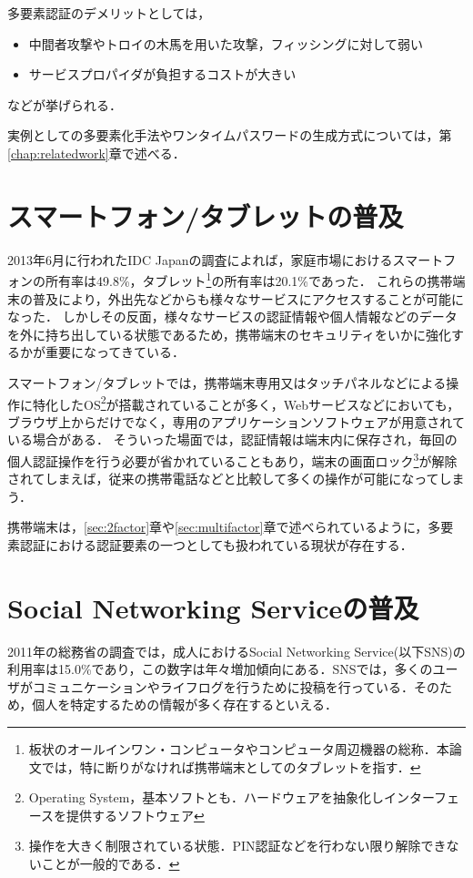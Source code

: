 多要素認証のデメリットとしては，
\begin{itemize}
\item 中間者攻撃やトロイの木馬を用いた攻撃，フィッシングに対して弱い
\item サービスプロパイダが負担するコストが大きい
\end{itemize}
などが挙げられる．

実例としての多要素化手法やワンタイムパスワードの生成方式については，第\ref{chap:relatedwork}章で述べる．

\section{スマートフォン/タブレットの普及}
2013年6月に行われたIDC Japanの調査\cite{idcsmartphone}によれば，家庭市場におけるスマートフォンの所有率は49.8\%，タブレット\footnote{板状のオールインワン・コンピュータやコンピュータ周辺機器の総称．本論文では，特に断りがなければ携帯端末としてのタブレットを指す．}の所有率は20.1\%であった．
これらの携帯端末の普及により，外出先などからも様々なサービスにアクセスすることが可能になった．
しかしその反面，様々なサービスの認証情報や個人情報などのデータを外に持ち出している状態であるため，携帯端末のセキュリティをいかに強化するかが重要になってきている．

スマートフォン/タブレットでは，携帯端末専用又はタッチパネルなどによる操作に特化したOS\footnote{Operating System，基本ソフトとも．ハードウェアを抽象化しインターフェースを提供するソフトウェア}が搭載されていることが多く，Webサービスなどにおいても，ブラウザ上からだけでなく，専用のアプリケーションソフトウェアが用意されている場合がある．
そういった場面では，認証情報は端末内に保存され，毎回の個人認証操作を行う必要が省かれていることもあり，端末の画面ロック\footnote{操作を大きく制限されている状態．PIN認証などを行わない限り解除できないことが一般的である．}が解除されてしまえば，従来の携帯電話などと比較して多くの操作が可能になってしまう．

携帯端末は，\ref{sec:2factor}章や\ref{sec:multifactor}章で述べられているように，多要素認証における認証要素の一つとしても扱われている現状が存在する．

\section{Social Networking Serviceの普及}
2011年の総務省の調査\cite{micwhitepaper24}では，成人におけるSocial Networking Service(以下SNS)の利用率は15.0\%であり，この数字は年々増加傾向にある．SNSでは，多くのユーザがコミュニケーションやライフログを行うために投稿を行っている．そのため，個人を特定するための情報が多く存在するといえる．

